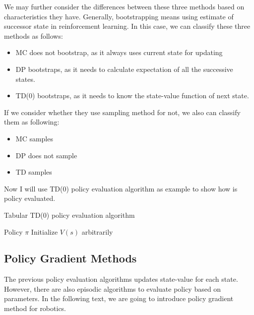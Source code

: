 \documentclass[officiallayout]{tktla}
\begin{document}
We may further consider the differences between these three methods based on characteristics they have. Generally, bootstrapping means using estimate of successor state in reinforcement learning. In this case, we can classify these three methods as follows:
\begin{itemize}
\item MC does not bootstrap, as it always uses current state for updating
\item DP bootstraps, as it needs to calculate expectation of all the successive states.
\item TD(0) bootstraps, as it needs to know the state-value function of next state.
\end{itemize}
If we consider whether they use sampling method for not, we also can classify them as following:
\begin{itemize}
\item MC samples
\item DP does not sample
\item TD samples
\end{itemize}

Now I will use TD(0) policy evaluation algorithm as example to show how is policy evaluated.
\newline
\newline
\begin{algorithm}[t]
\caption{Tabular TD(0) policy evaluation algorithm}
\label{algo:adam}
\begin{algorithmic}
 \REQUIRE Policy $\pi$
 Initialize $V(s)$ arbitrarily \;
\end{algorithmic}
\vspace{-0.05in}
\end{algorithm}

\newcommand{\wm}{\widehat{m}_t}
\newcommand{\wv}{\widehat{v}_t}



\subsection{Policy Gradient Methods}
The previous policy evaluation algorithms updates state-value for each state. However, there are also episodic algorithms to evaluate policy based on parameters. In the following text, we are going to introduce policy gradient method for robotics.
\end{document}

